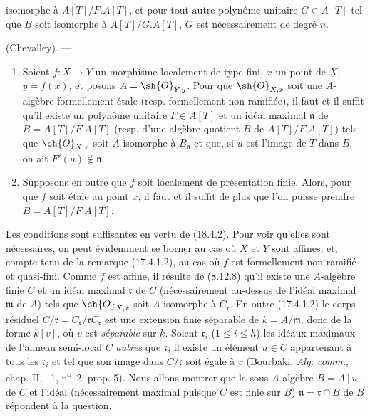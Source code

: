 
isomorphe à $A[T]/F.A[T]$, et pour tout autre polynôme unitaire $G\in A[T]$ tel que $B$ soit isomorphe à $A[T]/G.A[T]$, $G$ est nécessairement de degré $n$.

\begin{theorem}[18.4.6]
\label{IV.18.4.6}
(Chevalley). ---
\begin{enumerate}
  \item[(i)] Soient $f:X\to Y$ un morphisme localement de type fini, $x$ un point de $X$, $y=f(x)$, et posons $A=\sh{O}_{Y,y}$. Pour que $\sh{O}_{X,x}$ soit une $A$-algèbre formellement étale (resp. formellement non ramifiée), il faut et il suffit qu'il existe un polynôme unitaire $F\in A[T]$ et un idéal maximal $\mathfrak n$ de $B=A[T]/F.A[T]$ (resp. d'une algèbre quotient $B$ de $A[T]/F.A[T]$) tels que $\sh{O}_{X,x}$ soit $A$-isomorphe à $B_{\mathfrak n}$ et que, si $u$ est l'image de $T$ dans $B$, on ait $F'(u)\notin\mathfrak n$.
  \item[(ii)] Supposons en outre que $f$ soit localement de présentation finie. Alors, pour que $f$ soit étale au point $x$, il faut et il suffit de plus que l'on puisse prendre $B=A[T]/F.A[T]$.
\end{enumerate}
\end{theorem}

Les conditions sont suffisantes en vertu de (18.4.2). Pour voir qu'elles sont nécessaires, on peut évidemment se borner au cas où $X$ et $Y$ sont affines, et, compte tenu de la remarque (17.4.1.2), au cas où $f$ est formellement non ramifié et quasi-fini. Comme $f$ est affine, il résulte de (8.12.8) qu'il existe une $A$-algèbre finie $C$ et un idéal maximal $\mathfrak r$ de $C$ (nécessairement au-dessus de l'idéal maximal $\mathfrak m$ de $A$) tels que $\sh{O}_{X,x}$ soit $A$-isomorphe à $C_{\mathfrak r}$. En outre (17.4.1.2) le corps résiduel $C/\mathfrak r=C_{\mathfrak r}/\mathfrak rC_{\mathfrak r}$ est une extension finie séparable de $k=A/\mathfrak m$, donc de la forme $k[v]$, où $v$ est \emph{séparable} sur $k$. Soient $\mathfrak r_i$ ($1\leq i\leq h$) les idéaux maximaux de l'anneau semi-local $C$ \emph{autres} que $\mathfrak r$; il existe un élément $u\in C$ appartenant à tous les $\mathfrak r_i$ et tel que son image dans $C/\mathfrak r$ soit égale à $v$ (Bourbaki, \emph{Alg. comm.}, chap. II, \textsection~1, n\textsuperscript{o}~2, prop. 5). Nous allons montrer que la sous-$A$-algèbre $B=A[u]$ de $C$ et l'idéal (nécessairement maximal puisque $C$ est finie sur $B$) $\mathfrak n=\mathfrak r\cap B$ de $B$ répondent à la question.

